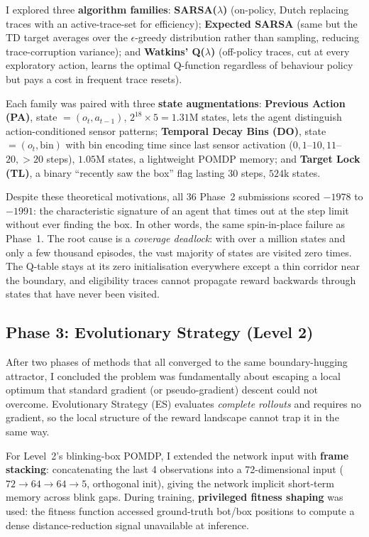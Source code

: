 \documentclass[11pt, oneside]{article}
\begin{document}
I explored three \textbf{algorithm families}: \textbf{SARSA($\lambda$)} \cite{rummery1994} (on-policy, Dutch replacing traces with an active-trace-set for efficiency); \textbf{Expected SARSA} (same but the TD target averages over the $\epsilon$-greedy distribution rather than sampling, reducing trace-corruption variance); and \textbf{Watkins' Q($\lambda$)} \cite{watkins1992} (off-policy traces, cut at every exploratory action, learns the optimal Q-function regardless of behaviour policy but pays a cost in frequent trace resets).

Each family was paired with three \textbf{state augmentations}: \textbf{Previous Action (PA)}, state $= (o_t, a_{t-1})$, $2^{18}\times 5 = 1.31\text{M}$ states, lets the agent distinguish action-conditioned sensor patterns; \textbf{Temporal Decay Bins (DO)}, state $= (o_t, \text{bin})$ with bin encoding time since last sensor activation ($0, 1$--$10, 11$--$20, {>}20$ steps), $1.05\text{M}$ states, a lightweight POMDP memory; and \textbf{Target Lock (TL)}, a binary ``recently saw the box'' flag lasting 30 steps, $524\text{k}$ states.

Despite these theoretical motivations, all 36 Phase~2 submissions scored $-1978$ to $-1991$: the characteristic signature of an agent that times out at the step limit without ever finding the box. In other words, the same spin-in-place failure as Phase~1. The root cause is a \emph{coverage deadlock}: with over a million states and only a few thousand episodes, the vast majority of states are visited zero times. The Q-table stays at its zero initialisation everywhere except a thin corridor near the boundary, and eligibility traces cannot propagate reward backwards through states that have never been visited.

\subsection{Phase 3: Evolutionary Strategy (Level 2)}

After two phases of methods that all converged to the same boundary-hugging attractor, I concluded the problem was fundamentally about escaping a local optimum that standard gradient (or pseudo-gradient) descent could not overcome. Evolutionary Strategy (ES) \cite{sehnke2010} evaluates \emph{complete rollouts} and requires no gradient, so the local structure of the reward landscape cannot trap it in the same way.

For Level~2's blinking-box POMDP, I extended the network input with \textbf{frame stacking}: concatenating the last 4 observations into a 72-dimensional input ($72\to64\to64\to5$, orthogonal init), giving the network implicit short-term memory across blink gaps. During training, \textbf{privileged fitness shaping} was used: the fitness function accessed ground-truth bot/box positions to compute a dense distance-reduction signal unavailable at inference.
\end{document}
